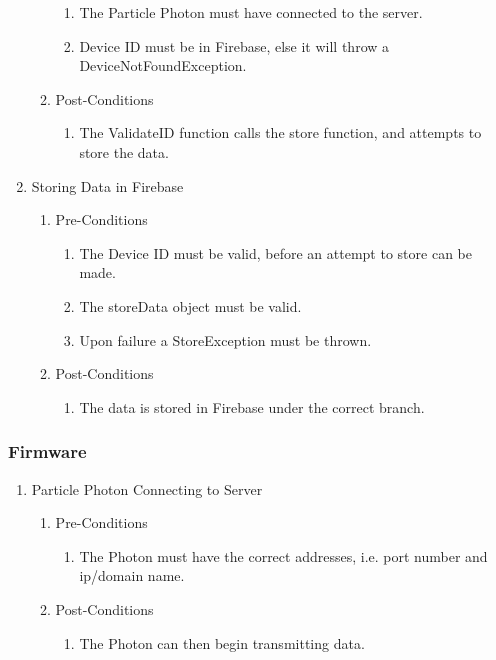 \documentclass{article}
\begin{document}
\begin{enumerate}
\begin{enumerate}
		\begin{enumerate}
			\item	The Particle Photon must have connected to the server.
			\item	Device ID must be in Firebase, else it will throw a DeviceNotFoundException.
		\end{enumerate}
		\item  Post-Conditions		
		\begin{enumerate}
			\item	The ValidateID function calls the store function, and attempts to store the data.
		\end{enumerate}
	\end{enumerate}
	\item	Storing Data in Firebase
	\begin{enumerate}
		\item  Pre-Conditions
		\begin{enumerate}
			\item	The Device ID must be valid, before an attempt to store can be made.
			\item	The storeData object must be valid.
			\item	Upon failure a StoreException must be thrown.
		\end{enumerate}
		\item  Post-Conditions		
		\begin{enumerate}
			\item	The data is stored in Firebase under the correct branch.
		\end{enumerate}
	\end{enumerate}
\end{enumerate}
	\subsubsection{Firmware}
	\begin{enumerate}
	\item	Particle Photon Connecting to Server	
	\begin{enumerate}
		\item  Pre-Conditions
		\begin{enumerate}
			\item	The Photon must have the correct addresses, i.e. port number and ip/domain name.
		\end{enumerate}
		\item  Post-Conditions		
		\begin{enumerate}
			\item	The Photon can then begin transmitting data.
		\end{enumerate}
	\end{enumerate}
\end{enumerate}
\end{document}
